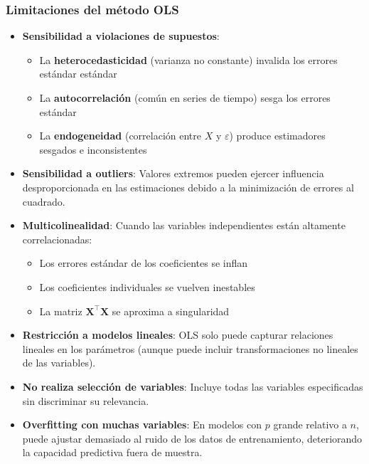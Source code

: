 \documentclass[
  doc,
  floatsintext,
  longtable,
  a4paper,
  nolmodern,
  notxfonts,
  notimes,
  12pt,
  colorlinks=true,linkcolor=blue,citecolor=blue,urlcolor=blue]{apa7}
\providecommand{\tightlist}{%
  \setlength{\itemsep}{0pt}\setlength{\parskip}{0pt}}
\begin{document}
\subsubsection{Limitaciones del método
OLS}\label{limitaciones-del-muxe9todo-ols}

\begin{itemize}
\item
  \textbf{Sensibilidad a violaciones de supuestos}:

  \begin{itemize}
  \tightlist
  \item
    La \textbf{heterocedasticidad} (varianza no constante) invalida los
    errores estándar estándar
  \item
    La \textbf{autocorrelación} (común en series de tiempo) sesga los
    errores estándar
  \item
    La \textbf{endogeneidad} (correlación entre \(X\) y \(\varepsilon\))
    produce estimadores sesgados e inconsistentes
  \end{itemize}
\item
  \textbf{Sensibilidad a outliers}: Valores extremos pueden ejercer
  influencia desproporcionada en las estimaciones debido a la
  minimización de errores al cuadrado.
\item
  \textbf{Multicolinealidad}: Cuando las variables independientes están
  altamente correlacionadas:

  \begin{itemize}
  \tightlist
  \item
    Los errores estándar de los coeficientes se inflan
  \item
    Los coeficientes individuales se vuelven inestables
  \item
    La matriz \(\mathbf{X}^\top\mathbf{X}\) se aproxima a singularidad
  \end{itemize}
\item
  \textbf{Restricción a modelos lineales}: OLS solo puede capturar
  relaciones lineales en los parámetros (aunque puede incluir
  transformaciones no lineales de las variables).
\item
  \textbf{No realiza selección de variables}: Incluye todas las
  variables especificadas sin discriminar su relevancia.
\item
  \textbf{Overfitting con muchas variables}: En modelos con \(p\) grande
  relativo a \(n\), puede ajustar demasiado al ruido de los datos de
  entrenamiento, deteriorando la capacidad predictiva fuera de muestra.
\end{itemize}
\end{document}
